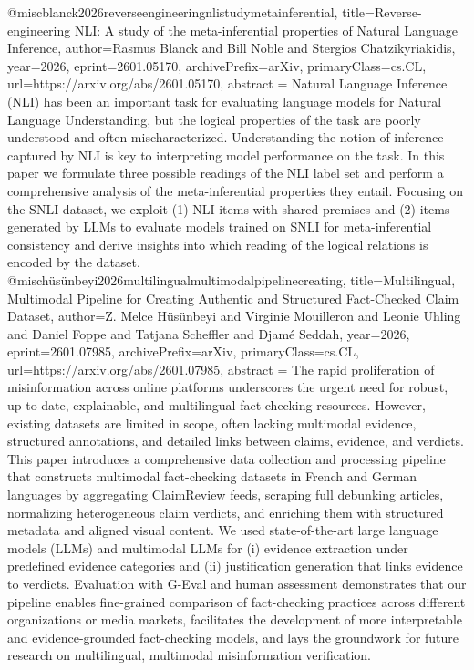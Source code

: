 {}@misc{blanck2026reverseengineeringnlistudymetainferential,
      title={Reverse-engineering NLI: A study of the meta-inferential properties of Natural Language Inference}, 
      author={Rasmus Blanck and Bill Noble and Stergios Chatzikyriakidis},
      year={2026},
      eprint={2601.05170},
      archivePrefix={arXiv},
      primaryClass={cs.CL},
      url={https://arxiv.org/abs/2601.05170},
      abstract = {Natural Language Inference (NLI) has been an important task for evaluating language models for Natural Language Understanding, but the logical properties of the task are poorly understood and often mischaracterized. Understanding the notion of inference captured by NLI is key to interpreting model performance on the task. In this paper we formulate three possible readings of the NLI label set and perform a comprehensive analysis of the meta-inferential properties they entail. Focusing on the SNLI dataset, we exploit (1) NLI items with shared premises and (2) items generated by LLMs to evaluate models trained on SNLI for meta-inferential consistency and derive insights into which reading of the logical relations is encoded by the dataset.}
}@misc{hüsünbeyi2026multilingualmultimodalpipelinecreating,
      title={Multilingual, Multimodal Pipeline for Creating Authentic and Structured Fact-Checked Claim Dataset}, 
      author={Z. Melce Hüsünbeyi and Virginie Mouilleron and Leonie Uhling and Daniel Foppe and Tatjana Scheffler and Djamé Seddah},
      year={2026},
      eprint={2601.07985},
      archivePrefix={arXiv},
      primaryClass={cs.CL},
      url={https://arxiv.org/abs/2601.07985},
      abstract = {The rapid proliferation of misinformation across online platforms underscores the urgent need for robust, up-to-date, explainable, and multilingual fact-checking resources. However, existing datasets are limited in scope, often lacking multimodal evidence, structured annotations, and detailed links between claims, evidence, and verdicts. This paper introduces a comprehensive data collection and processing pipeline that constructs multimodal fact-checking datasets in French and German languages by aggregating ClaimReview feeds, scraping full debunking articles, normalizing heterogeneous claim verdicts, and enriching them with structured metadata and aligned visual content. We used state-of-the-art large language models (LLMs) and multimodal LLMs for (i) evidence extraction under predefined evidence categories and (ii) justification generation that links evidence to verdicts. Evaluation with G-Eval and human assessment demonstrates that our pipeline enables fine-grained comparison of fact-checking practices across different organizations or media markets, facilitates the development of more interpretable and evidence-grounded fact-checking models, and lays the groundwork for future research on multilingual, multimodal misinformation verification.}
}
